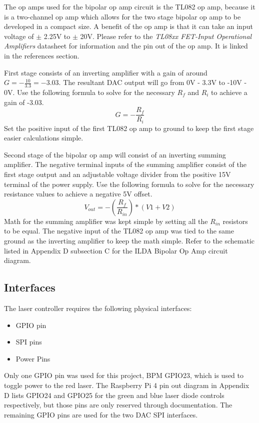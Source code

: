 \documentclass[journal]{IEEEtran}
\begin{document}
    The op amps used for the bipolar op amp circuit is the TL082 op amp, because it is a two-channel op amp which allows for the two stage bipolar op amp to be developed in a compact size.
    A benefit of the op amp is that it can take an input voltage of $\pm$ 2.25V to $\pm$ 20V.
    Please refer to the \emph{TL08xx FET-Input Operational Amplifiers} datasheet for information and the pin out of the op amp. It is linked in the references section.

    First stage consists of an inverting amplifier with a gain of around $G = - \frac{10}{3.3} = -3.03$.
    The resultant DAC output will go from 0V - 3.3V to -10V - 0V.
    Use the following formula to solve for the necessary $R_{f}$ and $R_{i}$ to achieve a gain of -3.03.
    $$ G = -\frac{R_{f}}{R_{i}}$$
    Set the positive input of the first TL082 op amp to ground to keep the first stage easier calculations simple.

    Second stage of the bipolar op amp will consist of an inverting summing amplifier.
    The negative terminal inputs of the summing amplifier consist of the first stage output and an adjustable voltage divider from the positive 15V terminal of the power supply.
    Use the following formula to solve for the necessary resistance values to achieve a negative 5V offset.
    $$ V_{out} = -(\frac{R_{f}}{R_{in}}) * (V1 + V2)$$ 
    Math for the summing amplifier was kept simple by setting all the $R_{in}$ resistors to be equal.
    The negative input of the TL082 op amp was tied to the same ground as the inverting amplifier to keep the math simple.
    Refer to the schematic listed in Appendix D subsection C for the ILDA Bipolar Op Amp circuit diagram.

    \subsection{Interfaces}
    The laser controller requires the following physical interfaces:
    \begin{itemize}
        \item GPIO pin
        \item SPI pins
        \item Power Pins
    \end{itemize}

    Only one GPIO pin was used for this project, BPM GPIO23, which is used to toggle power to the red laser.
    The Raspberry Pi 4 pin out diagram in Appendix D lists GPIO24 and GPIO25 for the green and blue laser diode controls respectively, but those pins are only reserved through documentation.
    The remaining GPIO pins are used for the two DAC SPI interfaces.
\end{document}
